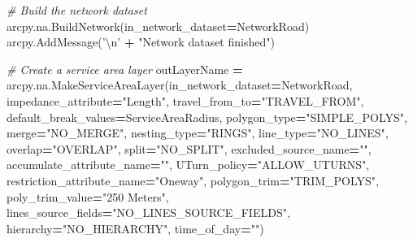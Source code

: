 \documentclass[11pt,]{article}
\newenvironment{Shaded}{\begin{snugshade}}{\end{snugshade}}
\newcommand{\CharTok}[1]{\textcolor[rgb]{0.31,0.60,0.02}{{#1}}}
\newcommand{\StringTok}[1]{\textcolor[rgb]{0.31,0.60,0.02}{{#1}}}
\newcommand{\CommentTok}[1]{\textcolor[rgb]{0.56,0.35,0.01}{\textit{{#1}}}}
\newcommand{\OperatorTok}[1]{\textcolor[rgb]{0.81,0.36,0.00}{\textbf{{#1}}}}
\newcommand{\NormalTok}[1]{{#1}}
\begin{document}
\begin{Shaded}
\begin{Highlighting}[]

    \CommentTok{# Build the network dataset}
    \NormalTok{arcpy.na.BuildNetwork(in_network_dataset}\OperatorTok{=}\NormalTok{NetworkRoad)}
    \NormalTok{arcpy.AddMessage(}\StringTok{'}\CharTok{\textbackslash{}n}\StringTok{'} \OperatorTok{+} \StringTok{"Network dataset finished"}\NormalTok{)}

    \CommentTok{# Create a service area layer}
    \NormalTok{outLayerName }\OperatorTok{=} \NormalTok{arcpy.na.MakeServiceAreaLayer(in_network_dataset}\OperatorTok{=}\NormalTok{NetworkRoad,}
                                \NormalTok{impedance_attribute}\OperatorTok{=}\StringTok{"Length"}\NormalTok{,}
                                \NormalTok{travel_from_to}\OperatorTok{=}\StringTok{"TRAVEL_FROM"}\NormalTok{,}
                                \NormalTok{default_break_values}\OperatorTok{=}\NormalTok{ServiceAreaRadius,}
                                \NormalTok{polygon_type}\OperatorTok{=}\StringTok{"SIMPLE_POLYS"}\NormalTok{,}
                                \NormalTok{merge}\OperatorTok{=}\StringTok{"NO_MERGE"}\NormalTok{,}
                                \NormalTok{nesting_type}\OperatorTok{=}\StringTok{"RINGS"}\NormalTok{,}
                                \NormalTok{line_type}\OperatorTok{=}\StringTok{"NO_LINES"}\NormalTok{,}
                                \NormalTok{overlap}\OperatorTok{=}\StringTok{"OVERLAP"}\NormalTok{,}
                                \NormalTok{split}\OperatorTok{=}\StringTok{"NO_SPLIT"}\NormalTok{,}
                                \NormalTok{excluded_source_name}\OperatorTok{=}\StringTok{""}\NormalTok{,}
                                \NormalTok{accumulate_attribute_name}\OperatorTok{=}\StringTok{""}\NormalTok{,}
                                \NormalTok{UTurn_policy}\OperatorTok{=}\StringTok{"ALLOW_UTURNS"}\NormalTok{,}
                                \NormalTok{restriction_attribute_name}\OperatorTok{=}\StringTok{"Oneway"}\NormalTok{,}
                                \NormalTok{polygon_trim}\OperatorTok{=}\StringTok{"TRIM_POLYS"}\NormalTok{,}
                                \NormalTok{poly_trim_value}\OperatorTok{=}\StringTok{"250 Meters"}\NormalTok{,}
                                \NormalTok{lines_source_fields}\OperatorTok{=}\StringTok{"NO_LINES_SOURCE_FIELDS"}\NormalTok{,}
                                \NormalTok{hierarchy}\OperatorTok{=}\StringTok{"NO_HIERARCHY"}\NormalTok{, time_of_day}\OperatorTok{=}\StringTok{""}\NormalTok{)}


\end{Highlighting}
\end{Shaded}
\end{document}
